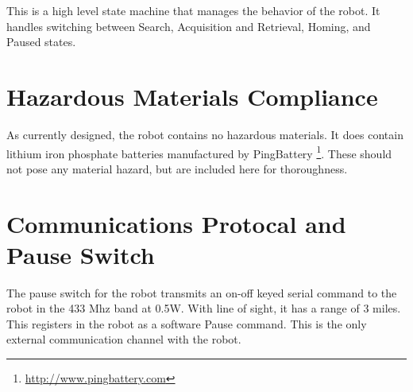 \documentclass[12pt]{article}
\begin{document}
This is a high level state machine that manages the behavior of the robot. It handles switching between Search, Acquisition and Retrieval, Homing, and Paused states.


\section{Hazardous Materials Compliance}\label{Hazardous}
As currently designed, the robot contains no hazardous materials. It does contain lithium iron phosphate batteries manufactured by PingBattery \footnote{\url{http://www.pingbattery.com}}. These should not pose any material hazard, but are included here for thoroughness.

\section{Communications Protocal and Pause Switch}\label{Comms}
The pause switch for the robot transmits an on-off keyed serial command to the robot in the 433 Mhz band at 0.5W. With line of sight, it has a range of 3 miles. This registers in the robot as a software Pause command. This is the only external communication channel with the robot.




\end{document}
